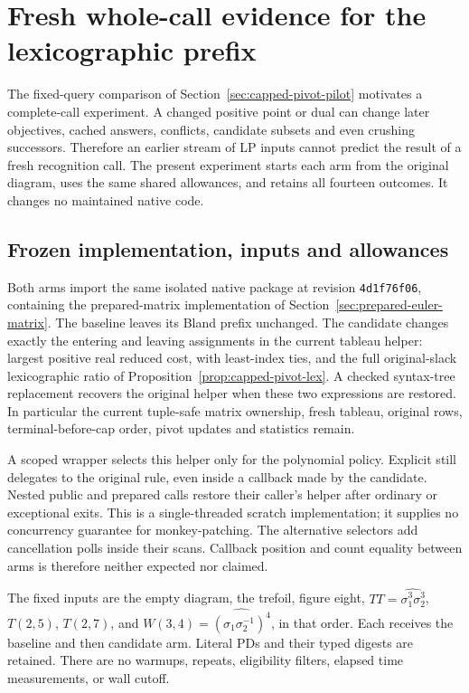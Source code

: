 \section{Fresh whole-call evidence for the lexicographic prefix}
\label{sec:whole-call-prefix}

The fixed-query comparison of Section~\ref{sec:capped-pivot-pilot} motivates
a complete-call experiment.  A changed positive point or dual can change
later objectives, cached answers, conflicts, candidate subsets and even
crushing successors.  Therefore an earlier stream of LP inputs cannot
predict the result of a fresh recognition call.  The present experiment
starts each arm from the original diagram, uses the same shared allowances,
and retains all fourteen outcomes.  It changes no maintained native code.

\subsection{Frozen implementation, inputs and allowances}

Both arms import the same isolated native package at revision
\texttt{4d1f76f06}, containing the prepared-matrix implementation of
Section~\ref{sec:prepared-euler-matrix}.  The baseline leaves its Bland
prefix unchanged.  The candidate changes exactly the entering and leaving
assignments in the current tableau helper: largest positive real reduced
cost, with least-index ties, and the full original-slack lexicographic ratio
of Proposition~\ref{prop:capped-pivot-lex}.  A checked syntax-tree replacement
recovers the original helper when these two expressions are restored.  In
particular the current tuple-safe matrix ownership, fresh tableau, original
rows, terminal-before-cap order, pivot updates and statistics remain.

A scoped wrapper selects this helper only for the polynomial policy.
Explicit  still delegates to the original rule, even
inside a callback made by the candidate.  Nested public and prepared calls
restore their caller's helper after ordinary or exceptional exits.  This
is a single-threaded scratch implementation; it supplies no concurrency
guarantee for monkey-patching.  The alternative selectors add cancellation
polls inside their scans.  Callback position and count equality between
arms is therefore neither expected nor claimed.

The fixed inputs are the empty diagram, the trefoil, figure eight,
$TT=\widehat{\sigma_1^3\sigma_2^3}$, $T(2,5)$, $T(2,7)$, and
$W(3,4)=\widehat{(\sigma_1\sigma_2^{-1})^4}$, in that order.  Each receives
the baseline and then candidate arm.  Literal PDs and their typed digests
are retained.  There are no warmups, repeats, eligibility filters, elapsed
time measurements, or wall cutoff.

